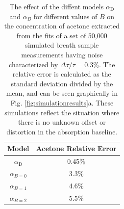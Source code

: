 \documentclass[8pt,a4paper]{report}
\begin{document}
	\begin{table}[H]
		\caption{The effect of the diffent models $\alpha_\mathrm{D}$ and $\alpha_B$ for different values of $B$ on the concentration of acetone extracted from the fits of a set of 50,000 simulated breath sample measurements having noise characterized by $\Delta \tau/\tau = 0.3\%$. The relative error is calculated as the standard deviation divided by the mean, and can be seen graphically in Fig. \ref{fig:simulationresults}a. These simulations reflect the situation where there is no unknown offset or distortion in the absorption baseline.}
		\begin{center}
			\begin{tabular}{|c|c|}
				\hline
				\textbf{Model} & \textbf{Acetone Relative Error} \\
				\hline
				$\alpha_\mathrm{D}$ & 0.45\% \\
				\hline
				$\alpha_{B=0}$ & 3.3\% \\
				\hline
				$\alpha_{B=1}$ & 4.6\% \\
				\hline
				$\alpha_{B=2}$ & 5.5\% \\
				\hline
			\end{tabular}
		\end{center}
		\label{tbl:simulation_errs_acetone}
	\end{table}
	
\end{document}

